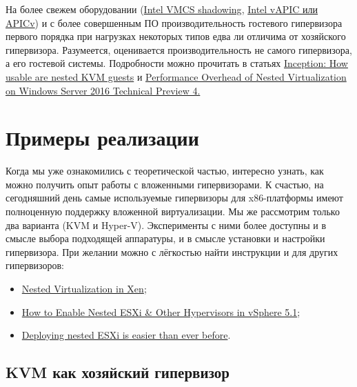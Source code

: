 \documentclass[14pt, a4paper]{article}
\begin{document}
На более свежем оборудовании (\href{https://www.intel.com/content/www/us/en/support/ru-banner-inside.html}{Intel VMCS shadowing}, 
\href{https://www.intel.com/content/www/us/en/support/ru-banner-inside.html}{Intel vAPIC или APICv}) и с более
совершенным ПО производительность гостевого гипервизора первого порядка при нагрузках
некоторых типов едва ли отличима от хозяйского гипервизора. Разумеется, оценивается
производительность не самого гипервизора, а его гостевой системы. Подробности можно прочитать в
статьях \href{https://www.redhat.com/en/blog/inception-how-usable-are-nested-kvm-guests}{Inception: How usable are nested KVM guests} 
и \href{https://blogs.technet.microsoft.com/larryexchange/2015/12/29/performance-overhead-of-nested-virtualization-on-windows-server-2016-technical-preview-4/}{Performance Overhead of Nested Virtualization on Windows Server 2016 Technical Preview 4.}

\section*{Примеры реализации}

Когда мы уже ознакомились с теоретической частью, интересно узнать, как можно получить опыт
работы с вложенными гипервизорами. К счастью, на сегодняшний день самые используемые
гипервизоры для x86-платформы имеют полноценную поддержку вложенной виртуализации. Мы же
рассмотрим только два варианта (KVM и Hyper-V). Эксперименты с ними более доступны и в смысле
выбора подходящей аппаратуры, и в смысле установки и настройки гипервизора. При желании можно
с лёгкостью найти инструкции и для других гипервизоров:

\begin{itemize}
    \item \href{https://wiki.xenproject.org/wiki/Nested_Virtualization_in_Xen}{Nested Virtualization in Xen};
    \item \href{https://www.virtuallyghetto.com/2012/08/how-to-enable-nested-esxi-other.html}{How to Enable Nested ESXi \& Other Hypervisors in vSphere 5.1};
    \item \href{https://www.altaro.com/vmware/deploying-nested-esxi-is-easier-than-ever-before/}{Deploying nested ESXi is easier than ever before}.
\end{itemize}

\newpage
\subsection*{KVM как хозяйский гипервизор}
\end{document}
